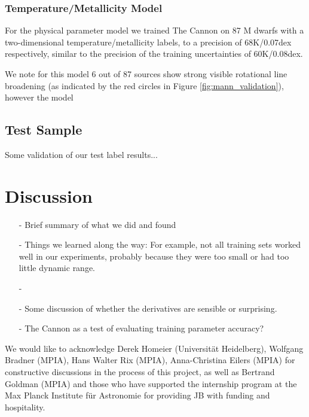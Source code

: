 \documentclass[modern]{aastex62}
\begin{document}
\subsubsection{Temperature/Metallicity Model}
For the physical parameter model we trained The Cannon on 87 M dwarfs with a two-dimensional temperature/metallicity labels, to a precision of 68K/0.07dex respectively, similar to the precision of the training uncertainties of 60K/0.08dex.

We note for this model 6 out of 87 sources show strong visible rotational line broadening (as indicated by the red circles in Figure \ref{fig:mann_validation}), however the model 

\color{gcolor}{HOGG: Some commentary on why $\chi^2$ is higher than expected.}\color{black}


\subsection{Test Sample}
Some validation of our test label results...


\section{Discussion} \label{sec:discussion}

\begin{enumerate}
\item[-] Brief summary of what we did and found

\item[-] Things we learned along the way: For example, not all training sets worked well in our experiments, probably because they were too small or had too little dynamic range.

\item[-] \color{gcolor}{HOGG: Some discussion of precision and accuracy: The Cannon can produce precise results, but is only as accurate as its training set.}\color{black}

\item[-] Some discussion of whether the derivatives are sensible or surprising. \color{red}{Add derivative plots.}\color{black}

\item[-] The Cannon as a test of evaluating training parameter accuracy? 
\end{enumerate}

\acknowledgements
We would like to acknowledge Derek Homeier (Universit{\"a}t Heidelberg), Wolfgang Bradner (MPIA), Hans Walter Rix (MPIA), Anna-Christina Eilers (MPIA) for constructive discussions in the process of this project, as well as Bertrand Goldman (MPIA) and those who have supported the internship program at the Max Planck Institute f{\"u}r Astronomie for providing JB with funding and hospitality. \color{gcolor}{HOGG: SDSS acknowledgments... Grants and stuff...}\color{black}  
\end{document}

